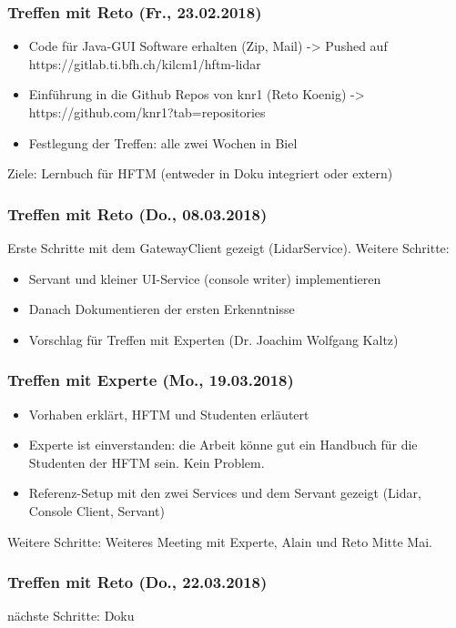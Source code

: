 \subsubsection{Treffen mit Reto (Fr., 23.02.2018)}
\begin{itemize}
	\item Code für Java-GUI Software erhalten (Zip, Mail) -> Pushed auf https://gitlab.ti.bfh.ch/kilcm1/hftm-lidar
	\item Einführung in die Github Repos von knr1 (Reto Koenig) -> https://github.com/knr1?tab=repositories
	\item Festlegung der Treffen: alle zwei Wochen in Biel
\end{itemize}
Ziele: Lernbuch für HFTM (entweder in Doku integriert oder extern)


\subsubsection{Treffen mit Reto (Do., 08.03.2018)}
Erste Schritte mit dem GatewayClient gezeigt (LidarService). Weitere Schritte:
\begin{itemize}
	\item Servant und kleiner UI-Service (console writer) implementieren
	\item Danach Dokumentieren der ersten Erkenntnisse
	\item Vorschlag für Treffen mit Experten (Dr. Joachim Wolfgang Kaltz)
\end{itemize}
\subsubsection{Treffen mit Experte (Mo., 19.03.2018)}
\begin{itemize}
	\item Vorhaben erklärt, HFTM und Studenten erläutert
	\item Experte ist einverstanden: die Arbeit könne gut ein Handbuch für die Studenten der HFTM sein. Kein Problem.
	\item Referenz-Setup mit den zwei Services und dem Servant gezeigt (Lidar, Console Client, Servant)
\end{itemize}
Weitere Schritte: Weiteres Meeting mit Experte, Alain und Reto Mitte Mai.
\subsubsection{Treffen mit Reto (Do., 22.03.2018)}
nächste Schritte: Doku

